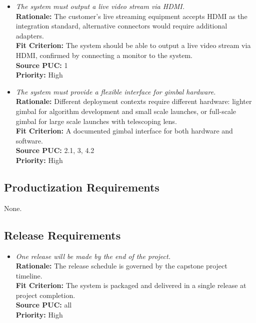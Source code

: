 \documentclass[12pt]{article}
\begin{document}
\begin{itemize}[leftmargin=*]
  \item[INT-1] \emph{The system must output a live video stream via HDMI.}\\[2mm]
        \textbf{Rationale:} The customer's live streaming equipment accepts HDMI as the integration standard, alternative connectors would require additional adapters.\\
        \textbf{Fit Criterion:} The system should be able to output a live video stream via HDMI, confirmed by connecting a monitor to the system.\\
        \textbf{Source PUC:} 1 \\
        \textbf{Priority:} High

  \item[INT-2] \emph{The system must provide a flexible interface for gimbal
          hardware.}\\[2mm]
        \textbf{Rationale:} Different deployment contexts require different hardware: lighter gimbal for algorithm development and small scale launches, or full-scale gimbal for large scale launches with telescoping lens.\\
        \textbf{Fit Criterion:} A documented gimbal interface for both hardware and software.\\
        \textbf{Source PUC:} 2.1, 3, 4.2 \\
        \textbf{Priority:} High
\end{itemize}

\subsection{Productization Requirements}

None.

\subsection{Release Requirements}
\begin{itemize}[leftmargin=*]
  \item[RR-1] \emph{One release will be made by the end of the project.}\\[2mm]
        \textbf{Rationale:} The release schedule is governed by the capstone project timeline.\\
        \textbf{Fit Criterion:} The system is packaged and delivered in a single release at project completion.\\
        \textbf{Source PUC:} all \\
        \textbf{Priority:} High
\end{itemize}
\end{document}

